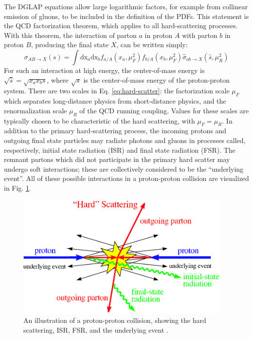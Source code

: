 The DGLAP equations allow large logarithmic factors, for example from col\-lin\-ear emission of gluons, to be included in the definition of the PDFs. This statement is the QCD factorization theorem, which applies to all hard-scattering processes. With this theorem, the interaction of parton $a$ in proton $A$ with parton $b$ in proton $B$, producing the final state $X$, can be written simply:
\begin{equation} \label{eq:hard-scatter}
\sigma_{AB \rightarrow X}(s) = \int{\text{dx}_{a}\text{dx}_{b} f_{a/A}(x_a,\mu_{F}^{2}) f_{b/A}(x_b,\mu_{F}^{2}) \hat{\sigma}_{ab \rightarrow X}(\hat{s},\mu_{R}^{2})}
\end{equation}
For such an interaction at high energy, the center-of-mass energy is $\sqrt{\hat{s}} = \sqrt{x_a x_b s}$, where $\sqrt{s}$ is the center-of-mass energy of the proton-proton system. There are two scales in Eq. \ref{eq:hard-scatter}: the factorization scale $\mu_{F}$ which separates long-distance physics from short-distance physics, and the renormalization scale $\mu_{R}$ of the QCD running coupling. Values for these scales are typically chosen to be characteristic of the hard scattering, with $\mu_{F} = \mu_{R}$. In addition to the primary hard-scattering process, the incoming protons and outgoing final state particles may radiate photons and gluons in processes called, respectively, initial state radiation (ISR) and final state radiation (FSR). The remnant partons which did not participate in the primary hard scatter may undergo soft interactions; these are collectively considered to be the ``underlying event''. All of these possible interactions in a proton-proton collision are visualized in Fig. \ref{fig:pp-collision}.

\begin{figure}[hbt]
\begin{center}
\includegraphics[width=0.95\textwidth]{figures/pp_collision_schematic.pdf}
\caption{An illustration of a proton-proton collision, showing the hard scattering, ISR, FSR, and the underlying event \cite{QuarkGluon}.}
\label{fig:pp-collision}
\end{center}
\end{figure}

